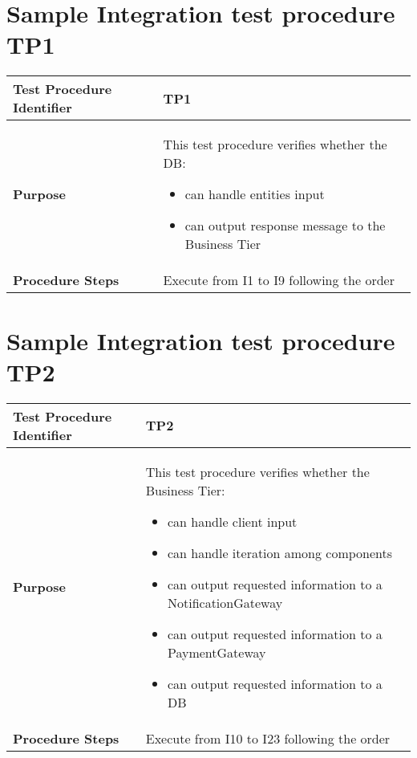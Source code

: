 \section{Sample Integration test procedure TP1} \label{TP1}
\begin{center}
	\vspace{0.6cm}
	\begin{tabular}{|l|p{9cm}|}
		\hline
		\textbf{Test Procedure Identifier} & TP1 \bigstrut \\\hline
		\textbf{Purpose} 
		& This test procedure verifies whether the DB: 
		\begin{itemize} 
			\item can handle entities input
			\item can output response message to the Business Tier %
		\end{itemize} \bigstrut \\\hline
		\textbf{Procedure Steps} & Execute from I1 to I9 following the order \bigstrut \\\hline
	\end{tabular}
\end{center}

\section{Sample Integration test procedure TP2} \label{TP2}
\begin{center}
	\vspace{0.6cm}
	\begin{tabular}{|l|p{9cm}|}
		\hline
		\textbf{Test Procedure Identifier} & TP2 \bigstrut \\\hline
		\textbf{Purpose} 
		& This test procedure verifies whether the Business Tier: 
		\begin{itemize} 
			\item can handle client input
			\item can handle iteration among components 
			\item can output requested information to a NotificationGateway
			\item can output requested information to a PaymentGateway
			\item can output requested information to a DB
		\end{itemize} \bigstrut \\\hline
		\textbf{Procedure Steps} & Execute from I10 to I23 following the order \bigstrut \\\hline
	\end{tabular}
\end{center}

